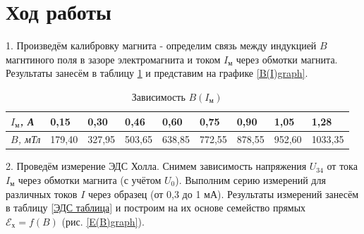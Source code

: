 \documentclass[a4paper, 12pt]{article}
\begin{document}
\newpage

\section{Ход работы}

1. Произведём калибровку магнита - определим связь между индукцией $B$ магнтиного поля  в зазоре электромагнита и током $I_{м}$ через обмотки магнита. Результаты занесём в таблицу \ref{B(I)tab} и представим на графике \ref{B(I)graph}.


\begin{table}[h]	
\caption{Зависимость $B(I_\text{м})$}
\begin{tabular}{|l|l|l|l|l|l|l|l|l|} 	
\hline
\textit{$I_\text{м}$, А}   & 0,15   & 0,30   & 0,46   & 0,60   & 0,75   & 0,90   & 1,05   & 1,28    \\
\hline
\textit{$B$, мТл} & 179,40 & 327,95 & 503,65 & 638,85 & 772,55 & 878,55 & 952,60 & 1033,35 \\
\hline
\end{tabular}
\label{B(I)tab}
\end{table}

2. Проведём измерение ЭДС Холла. Снимем зависимость напряжения $U_{34}$ от тока $I_{м}$ через обмотки магнита (с учётом $U_0$). Выполним серию измерений для различных токов $I$ через образец (от 0,3 до 1 мА). Результаты измерений занесём в таблицу \ref{ЭДС таблица} и построим на их основе семейство прямых $\mathscr{E_\text{х}} = f(B)$ (рис. \ref{E(B)graph}).
\end{document}

